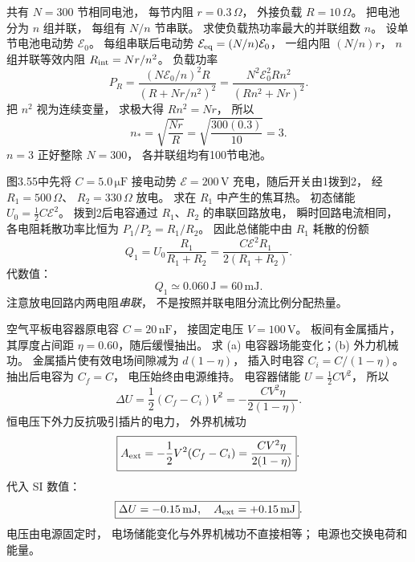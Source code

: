 共有 $N=300$ 节相同电池，
每节内阻 $r=0.3\,\Omega$，
外接负载 $R=10\,\Omega$。
把电池分为 $n$ 组并联，
每组有 $N/n$ 节串联。
求使负载热功率最大的并联组数 $n$。
\exsolution
设单节电池电动势 $\mathcal E_0$。
每组串联后电动势
$\mathcal E_{\rm eq}=(N/n)\mathcal E_0$，
一组内阻 $(N/n)r$，
$n$ 组并联等效内阻
$R_{\rm int}=Nr/n^2$。
负载功率
\[
P_R=\frac{(N\mathcal E_0/n)^2 R}
{(R+Nr/n^2)^2}
=\frac{N^2\mathcal E_0^2Rn^2}
{(Rn^2+Nr)^2}.
\]
把 $n^2$ 视为连续变量，
求极大得 $Rn^2=Nr$，
所以
\[
\boxed{n_*=\sqrt{\frac{Nr}R}
=\sqrt{\frac{300(0.3)}{10}}=3}.
\]
\excheck $n=3$ 正好整除 $N=300$，
各并联组均有100节电池。

图3.55中先将 $C=5.0\,\mathrm{\mu F}$
接电动势 $\mathcal E=200\,\mathrm V$
充电，随后开关由1拨到2，
经 $R_1=500\,\Omega$、
$R_2=330\,\Omega$ 放电。
求在 $R_1$ 中产生的焦耳热。
\exsolution
初态储能
$U_0=\frac12C\mathcal E^2$。
拨到2后电容通过
$R_1$、$R_2$ 的串联回路放电，
瞬时回路电流相同，
各电阻耗散功率比恒为
$P_1/P_2=R_1/R_2$。
因此总储能中由 $R_1$ 耗散的份额
\[
Q_1=U_0\frac{R_1}{R_1+R_2}
=\boxed{\frac{C\mathcal E^2R_1}{2(R_1+R_2)}}.
\]
代数值：
\[
\boxed{Q_1\simeq0.060\,\mathrm J=60\,\mathrm{mJ}}.
\]
\excheck 注意放电回路内两电阻\emph{串联}，
不是按照并联电阻分流比例分配热量。

空气平板电容器原电容
$C=20\,\mathrm{nF}$，
接固定电压 $V=100\,\mathrm V$。
板间有金属插片，其厚度占间距
$\eta=0.60$，随后缓慢抽出。
求 (a) 电容器场能变化；(b) 外力机械功。
\exsolution
金属插片使有效电场间隙减为
$d(1-\eta)$，
插入时电容
$C_i=C/(1-\eta)$。
抽出后电容为 $C_f=C$，
电压始终由电源维持。
电容器储能 $U=\frac12CV^2$，
所以
\[
\boxed{\Delta U=
\frac12(C_f-C_i)V^2
=-\frac{CV^2\eta}{2(1-\eta)}}.
\]
恒电压下外力反抗吸引插片的电力，
外界机械功
\[
\boxed{A_{\rm ext}=-\frac12V^2(C_f-C_i)
=\frac{CV^2\eta}{2(1-\eta)}}.
\]
代入 SI 数值：
\[
\boxed{\Delta U=-0.15\,\mathrm{mJ},
\quad A_{\rm ext}=+0.15\,\mathrm{mJ}}.
\]
\excheck 电压由电源固定时，
电场储能变化与外界机械功不直接相等；
电源也交换电荷和能量。

